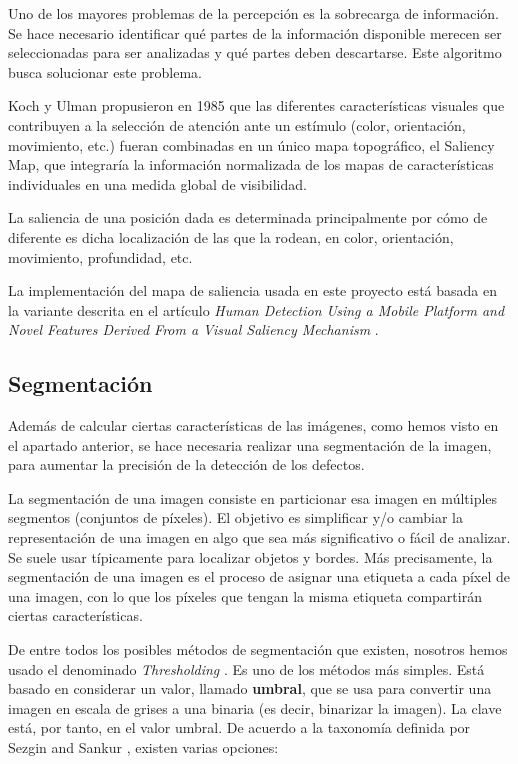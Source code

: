 Uno de los mayores problemas de la percepción es la sobrecarga de información. Se hace necesario identificar qué partes de la información disponible merecen ser seleccionadas para ser analizadas y qué partes deben descartarse. Este algoritmo busca solucionar este problema.

Koch y Ulman propusieron en 1985 \cite{koch1985shifts} que las diferentes características visuales que contribuyen a la selección de atención ante un estímulo (color, orientación, movimiento, etc.) fueran combinadas en un único mapa topográfico, el Saliency Map, que integraría la información normalizada de los mapas de características individuales en una medida global de visibilidad.

La saliencia de una posición dada es determinada principalmente por cómo de diferente es dicha
localización de las que la rodean, en color, orientación, movimiento, profundidad, etc.

La implementación del mapa de saliencia usada en este proyecto está basada en la variante
descrita en el artículo \emph{Human Detection Using a Mobile Platform and Novel Features Derived
From a Visual Saliency Mechanism} \cite{montabone2010human}.


\subsection{Segmentación}\label{segmentacion}
Además de calcular ciertas características de las imágenes, como hemos visto en el apartado anterior, se hace necesaria realizar una segmentación de la imagen, para aumentar la precisión de la detección de los defectos.

La segmentación de una imagen \cite{wiki:segmentation} consiste en particionar esa imagen en múltiples segmentos (conjuntos de píxeles). El objetivo es simplificar y/o cambiar la representación de una imagen en algo que sea más significativo o fácil de analizar. Se suele usar típicamente para localizar objetos y bordes. Más precisamente, la segmentación de una imagen es el proceso de asignar una etiqueta a cada píxel de una imagen, con lo que los píxeles que tengan la misma etiqueta compartirán ciertas características.

De entre todos los posibles métodos de segmentación que existen, nosotros hemos usado el denominado \textit{Thresholding} \cite{wiki:thresholding}. Es uno de los métodos más simples. Está basado en considerar un valor, llamado \textbf{umbral}, que se usa para convertir una imagen en escala de grises a una binaria (es decir, binarizar la imagen). La clave está, por tanto, en el valor umbral. De acuerdo a la taxonomía definida por Sezgin and Sankur \cite{sezgin}, existen varias opciones:


